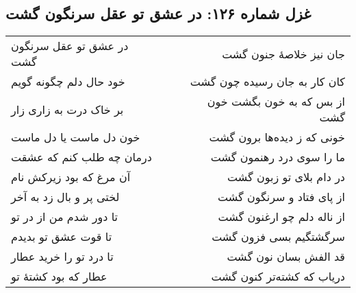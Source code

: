 \begin{center}
\section*{غزل شماره ۱۲۶: در عشق تو عقل سرنگون گشت}
\label{sec:126}
\begin{longtable}{l p{0.5cm} r}
در عشق تو عقل سرنگون گشت
&&
جان نیز خلاصهٔ جنون گشت
\\
خود حال دلم چگونه گویم
&&
کان کار به جان رسیده چون گشت
\\
بر خاک درت به زاری زار
&&
از بس که به خون بگشت خون گشت
\\
خون دل ماست یا دل ماست
&&
خونی که ز دیده‌ها برون گشت
\\
درمان چه طلب کنم که عشقت
&&
ما را سوی درد رهنمون گشت
\\
آن مرغ که بود زیرکش نام
&&
در دام بلای تو زبون گشت
\\
لختی پر و بال زد به آخر
&&
از پای فتاد و سرنگون گشت
\\
تا دور شدم من از در تو
&&
از ناله دلم چو ارغنون گشت
\\
تا قوت عشق تو بدیدم
&&
سرگشتگیم بسی فزون گشت
\\
تا درد تو را خرید عطار
&&
قد الفش بسان نون گشت
\\
عطار که بود کشتهٔ تو
&&
دریاب که کشته‌تر کنون گشت
\\
\end{longtable}
\end{center}
